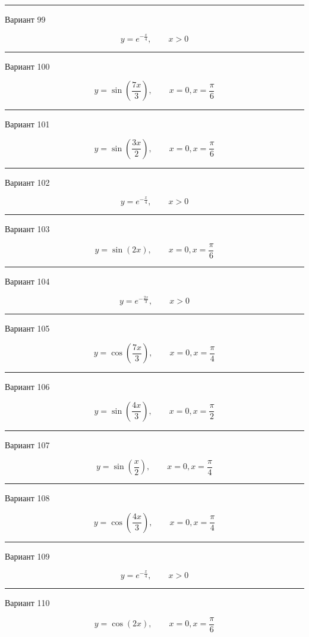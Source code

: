 \documentclass[11pt]{report}
\begin{document}
\rule{\textwidth}{.2mm}

Вариант 99

$$y=e^{- \frac{x}{4}}, \qquad x > 0$$

\rule{\textwidth}{.2mm}

Вариант 100

$$y=\sin{\left(\frac{7 x}{3} \right)}, \qquad x = 0, x = \frac{\pi}{6}$$

\rule{\textwidth}{.2mm}

Вариант 101

$$y=\sin{\left(\frac{3 x}{2} \right)}, \qquad x = 0, x = \frac{\pi}{6}$$

\rule{\textwidth}{.2mm}

Вариант 102

$$y=e^{- \frac{x}{4}}, \qquad x > 0$$

\rule{\textwidth}{.2mm}

Вариант 103

$$y=\sin{\left(2 x \right)}, \qquad x = 0, x = \frac{\pi}{6}$$

\rule{\textwidth}{.2mm}

Вариант 104

$$y=e^{- \frac{2 x}{3}}, \qquad x > 0$$

\rule{\textwidth}{.2mm}

Вариант 105

$$y=\cos{\left(\frac{7 x}{3} \right)}, \qquad x = 0, x = \frac{\pi}{4}$$

\rule{\textwidth}{.2mm}

Вариант 106

$$y=\sin{\left(\frac{4 x}{3} \right)}, \qquad x = 0, x = \frac{\pi}{2}$$

\rule{\textwidth}{.2mm}

Вариант 107

$$y=\sin{\left(\frac{x}{2} \right)}, \qquad x = 0, x = \frac{\pi}{4}$$

\rule{\textwidth}{.2mm}

Вариант 108

$$y=\cos{\left(\frac{4 x}{3} \right)}, \qquad x = 0, x = \frac{\pi}{4}$$

\rule{\textwidth}{.2mm}

Вариант 109

$$y=e^{- \frac{x}{4}}, \qquad x > 0$$

\rule{\textwidth}{.2mm}

Вариант 110

$$y=\cos{\left(2 x \right)}, \qquad x = 0, x = \frac{\pi}{6}$$
\end{document}
